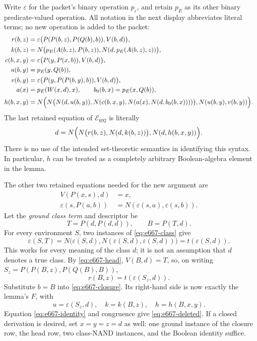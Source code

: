 Write \(\varepsilon\) for the packet's binary operation
\(p_\varepsilon\), and retain \(p_E\) as its other binary predicate-valued
operation.  All notation in the next display abbreviates literal terms;
no new operation is added to the packet:
\begin{align*}
 r(b,z)&=\varepsilon\bigl(P(P(b,z),P(Q(b),b)),V(b,d)\bigr),\\
 k(b,z)&=N\bigl(p_E(A(b,z),P(b,z)),N(d,p_E(A(b,z),z))\bigr),\\
 c(b,x,y)&=\varepsilon\bigl(P(y,P(x,b)),V(b,d)\bigr),\\
 u(b,y)&=p_E(y,Q(b)),\\
 v(b,y)&=\varepsilon\bigl(P(y,P(P(b,y),b)),V(b,d)\bigr),\\
 a(x)&=p_E(W(x,d),x),\qquad b_0(b,x)=p_E(x,Q(b)),\\
 h(b,x,y)&=N\Bigl(
   N\bigl(N(d,u(b,y)),N(c(b,x,y),N(a(x),N(d,b_0(b,x))))\bigr),
   N(u(b,y),v(b,y))\Bigr).
\end{align*}
The last retained equation of \(\mathcal E_{692}\) is literally
\begin{equation}
 d=N\Bigl(N\bigl(r(b,z),N(d,k(b,z))\bigr),N(d,h(b,x,y))\Bigr).
\label{eq:e667-closure}
\end{equation}
There is no use of the intended set-theoretic semantics in identifying
this syntax.  In particular, \(h\) can be treated as a completely arbitrary
Boolean-algebra element in the lemma.

The other two retained equations needed for the new argument are
\begin{align}
                   V(P(x,s),d)&=x,\label{eq:e667-head}\\
 \varepsilon(s,P(a,b))&=N(\varepsilon(s,a),\varepsilon(s,b)).
 \label{eq:e667-class}
\end{align}
Let the \emph{ground class term} and descriptor be
\[
             T=P(d,P(d,d)),\qquad B=P(T,d).
\]
For every environment \(S\), two instances of
\eqref{eq:e667-class} give
\begin{equation}
 \varepsilon(S,T)
   =N\bigl(\varepsilon(S,d),N(\varepsilon(S,d),\varepsilon(S,d))\bigr)
   =t(\varepsilon(S,d)).
\label{eq:e667-tautology}
\end{equation}
This works for every meaning of the class \(d\); it is not an assumption
that \(d\) denotes a true class.  By \eqref{eq:e667-head}, \(V(B,d)=T\),
so, on writing \(S_z=P(P(B,z),P(Q(B),B))\),
\[
                     r(B,z)=t(\varepsilon(S_z,d)).
\]
Substitute \(b=B\) into \eqref{eq:e667-closure}.  Its right-hand side is
now exactly the lemma's \(F\), with
\[
 u=\varepsilon(S_z,d),\quad k=k(B,z),\quad h=h(B,x,y).
\]
Equation \eqref{eq:e667-identity} and congruence give
\eqref{eq:e667-deleted}.  If a closed derivation is desired, set
\(x=y=z=d\) as well: one ground instance of the closure row, the head
row, two class-NAND instances, and the Boolean identity suffice.

